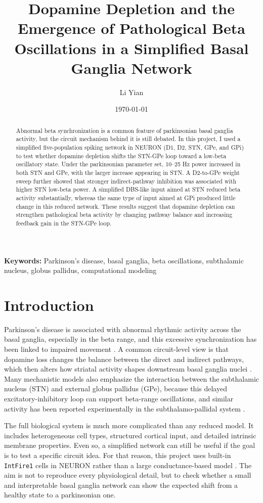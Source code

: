 \documentclass[11pt]{article}
\title{Dopamine Depletion and the Emergence of Pathological Beta Oscillations in a Simplified Basal Ganglia Network}
\author{Li Yian}
\date{\today}
\begin{document}
\maketitle

\begin{abstract}
Abnormal beta synchronization is a common feature of parkinsonian basal ganglia activity, but the circuit mechanism behind it is still debated. In this project, I used a simplified five-population spiking network in NEURON (D1, D2, STN, GPe, and GPi) to test whether dopamine depletion shifts the STN-GPe loop toward a low-beta oscillatory state. Under the parkinsonian parameter set, 10--25 Hz power increased in both STN and GPe, with the larger increase appearing in STN. A D2-to-GPe weight sweep further showed that stronger indirect-pathway inhibition was associated with higher STN low-beta power. A simplified DBS-like input aimed at STN reduced beta activity substantially, whereas the same type of input aimed at GPi produced little change in this reduced network. These results suggest that dopamine depletion can strengthen pathological beta activity by changing pathway balance and increasing feedback gain in the STN-GPe loop.
\end{abstract}

\noindent\textbf{Keywords:} Parkinson's disease, basal ganglia, beta oscillations, subthalamic nucleus, globus pallidus, computational modeling

\section{Introduction}
Parkinson's disease is associated with abnormal rhythmic activity across the basal ganglia, especially in the beta range, and this excessive synchronization has been linked to impaired movement \citep{Brown2007,Hammond2007}. A common circuit-level view is that dopamine loss changes the balance between the direct and indirect pathways, which then alters how striatal activity shapes downstream basal ganglia nuclei \citep{Albin1989,DeLong1990,Obeso2008}. Many mechanistic models also emphasize the interaction between the subthalamic nucleus (STN) and external globus pallidus (GPe), because this delayed excitatory-inhibitory loop can support beta-range oscillations, and similar activity has been reported experimentally in the subthalamo-pallidal system \citep{Mallet2008,Holgado2010}.

The full biological system is much more complicated than any reduced model. It includes heterogeneous cell types, structured cortical input, and detailed intrinsic membrane properties. Even so, a simplified network can still be useful if the goal is to test a specific circuit idea. For that reason, this project uses built-in \texttt{IntFire1} cells in NEURON rather than a large conductance-based model \citep{HinesCarnevale1997}. The aim is not to reproduce every physiological detail, but to check whether a small and interpretable basal ganglia network can show the expected shift from a healthy state to a parkinsonian one.
\end{document}

